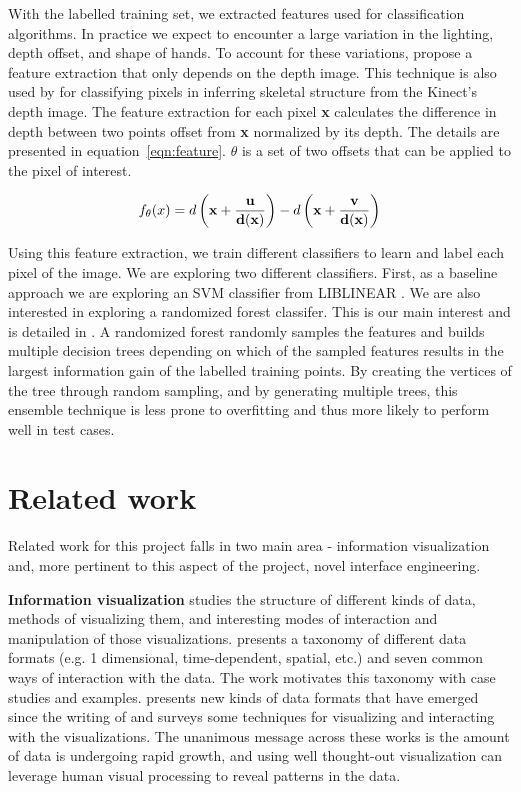 \documentclass[11pt]{article}
\begin{document}
With the labelled training set, we extracted features used for classification algorithms. In practice we expect to encounter a large variation in the lighting, depth offset, and shape of hands. To account for these variations, \cite{lepetit2005} propose a feature extraction that only depends on the depth image. This technique is also used by \cite{shotton2011} for classifying pixels in inferring skeletal structure from the Kinect's depth image. The feature extraction for each pixel \textbf{x} calculates the difference in depth between two points offset from \textbf{x} normalized by its depth. The details are presented in equation~\ref{eqn:feature}. $\theta$ is a set of two offsets that can be applied to the pixel of interest.  

\begin{equation} 
\label{eqn:feature}
f_{\theta}(x) = d\left(\bf{x} + \frac{\bf{u}}{d(\bf{x})}\right) - d\left(\bf{x} + \frac{\bf{v}}{d(\bf{x})}\right)
\end{equation}

Using this feature extraction, we train different classifiers to learn and label each pixel of the image. We are exploring two different classifiers. First, as a baseline approach we are exploring an SVM classifier from LIBLINEAR \cite{liblinear}. We are also interested in exploring a randomized forest classifer. This is our main interest and is detailed in \cite{lepetit2005}. A randomized forest randomly samples the features and builds multiple decision trees depending on which of the sampled features results in the largest information gain of the labelled training points. By creating the vertices of the tree through random sampling, and by generating multiple trees, this ensemble technique is less prone to overfitting and thus more likely to perform well in test cases. 

\section{Related work}
Related work for this project falls in two main area - information visualization and, more pertinent to this aspect of the project, novel interface engineering.

\textbf{Information visualization} studies the structure of different kinds of data, methods of visualizing them, and interesting modes of interaction and manipulation of those visualizations. \cite{schneiderman1996} presents a taxonomy of different data formats (e.g. 1 dimensional, time-dependent, spatial, etc.) and seven common ways of interaction with the data. The work motivates this taxonomy with case studies and examples. \cite{keim2002} presents new kinds of data formats that have emerged since the writing of \cite{schneiderman1996} and surveys some techniques for visualizing and interacting with the visualizations. The unanimous message across these works is the amount of data is undergoing rapid growth, and using well thought-out visualization can leverage human visual processing to reveal patterns in the data. 
\end{document}
